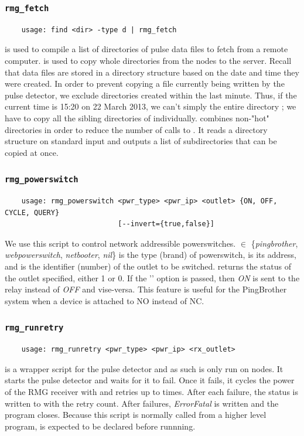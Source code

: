 \documentclass[letter]{article}
\begin{document}
\subsubsection{\texttt{rmg\_fetch}}
\begin{verbatim}
    usage: find <dir> -type d | rmg_fetch 
\end{verbatim}
 is used to compile a list of directories of pulse data files to fetch
from a remote computer.  is used to copy whole directories from the nodes 
to the server. Recall that data files are stored in a directory structure 
based on the date and time they were created. In order to prevent copying a file currently 
being written by the pulse detector, we exclude directories created within the 
last minute. Thus, if the current time is 15:20 on 22 March 2013, we can't simply 
the entire directory ; we have to copy all the sibling
directories of  individually. 
combines non-"hot" directories in order to reduce the number of calls to . It reads
a directory structure on standard input and outputs a list of subdirectories that can be 
copied at once. 
  
  
\subsubsection{\texttt{rmg\_powerswitch}}
\begin{verbatim}
    usage: rmg_powerswitch <pwr_type> <pwr_ip> <outlet> {ON, OFF, CYCLE, QUERY} 
                           [--invert={true,false}]
\end{verbatim}
We use this script to control network addressible powerswitches.  $
\in$ \{\textit{pingbrother}, \textit{webpowerswitch}, \textit{netbooter}, \textit{nil}\} is the 
type (brand) of powerswitch,  is its address, and  is 
the identifier (number) of the outlet to be switched.  returns the status of the 
outlet specified, either 1 or 0. If the '' option is passed, then 
\textit{ON} is sent to the relay instead of \textit{OFF} and vise-versa. This feature is 
useful for the PingBrother system when a device is attached to NO instead of NC. 


\subsubsection{\texttt{rmg\_runretry}}
\begin{verbatim}
    usage: rmg_runretry <pwr_type> <pwr_ip> <rx_outlet>
\end{verbatim}
 is a wrapper script for the pulse detector and as such is only
run on nodes. It starts the pulse detector and waits for it to fail. Once it fails, 
it cycles the power of the RMG receiver with  and retries up 
to  times. After each failure, the status is written to 
with the retry count. After  failures, \textit{ErrorFatal} is written and 
the program closes. Because this script is normally called from a higher level
program,  is expected to be declared before runnning.
\end{document}
